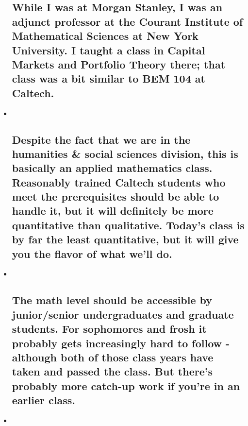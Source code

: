 \documentclass[11pt]{article}
\begin{document}
\begin{itemize}
  \subsection{While I was at Morgan Stanley, I was an adjunct professor
  at the Courant Institute of Mathematical Sciences at New York
  University. I taught a class in Capital Markets and Portfolio Theory
  there; that class was a bit similar to BEM 104 at
  Caltech.}\label{while-i-was-at-morgan-stanley-i-was-an-adjunct-professor-at-the-courant-institute-of-mathematical-sciences-at-new-york-university.-i-taught-a-class-in-capital-markets-and-portfolio-theory-there-that-class-was-a-bit-similar-to-bem-104-at-caltech.}
\item ~
  \subsection{Despite the fact that we are in the humanities \& social
  sciences division, this is basically an applied mathematics class.
  Reasonably trained Caltech students who meet the prerequisites should
  be able to handle it, but it will definitely be more quantitative than
  qualitative. Today's class is by far the least quantitative, but it
  will give you the flavor of what we'll
  do.}\label{despite-the-fact-that-we-are-in-the-humanities-social-sciences-division-this-is-basically-an-applied-mathematics-class.-reasonably-trained-caltech-students-who-meet-the-prerequisites-should-be-able-to-handle-it-but-it-will-definitely-be-more-quantitative-than-qualitative.-todays-class-is-by-far-the-least-quantitative-but-it-will-give-you-the-flavor-of-what-well-do.}
\item ~
  \subsection{The math level should be accessible by junior/senior
  undergraduates and graduate students. For sophomores and frosh it
  probably gets increasingly hard to follow - although both of those
  class years have taken and passed the class. But there's probably more
  catch-up work if you're in an earlier
  class.}\label{the-math-level-should-be-accessible-by-juniorsenior-undergraduates-and-graduate-students.-for-sophomores-and-frosh-it-probably-gets-increasingly-hard-to-follow---although-both-of-those-class-years-have-taken-and-passed-the-class.-but-theres-probably-more-catch-up-work-if-youre-in-an-earlier-class.}
\item ~

\end{itemize}
\end{document}
